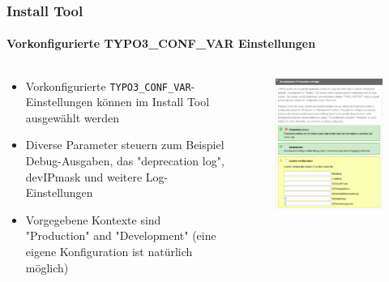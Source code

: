 \begin{frame}[fragile]
	\frametitle{Install Tool}
	\framesubtitle{Vorkonfigurierte TYPO3\_CONF\_VAR Einstellungen}

	\begin{columns}[T]
		\begin{column}{.5\textwidth}

			\begin{itemize}
				\item Vorkonfigurierte \texttt{TYPO3\_CONF\_VAR}-Einstellungen können im Install Tool ausgewählt werden
				\item Diverse Parameter steuern zum Beispiel Debug-Ausgaben, das "deprecation log", devIPmask und weitere Log-Einstellungen
				\item Vorgegebene Kontexte sind "Production" and "Development"\newline
					(eine eigene Konfiguration ist natürlich möglich)
			\end{itemize}

		\end{column}
		\begin{column}{.5\textwidth}

			\begin{figure}\vspace*{-0.4cm}
				\includegraphics[width=0.8\linewidth]{Images/InstallTool/PresetsOfSettings.png}
			\end{figure}

		\end{column}
	\end{columns}

\end{frame}

